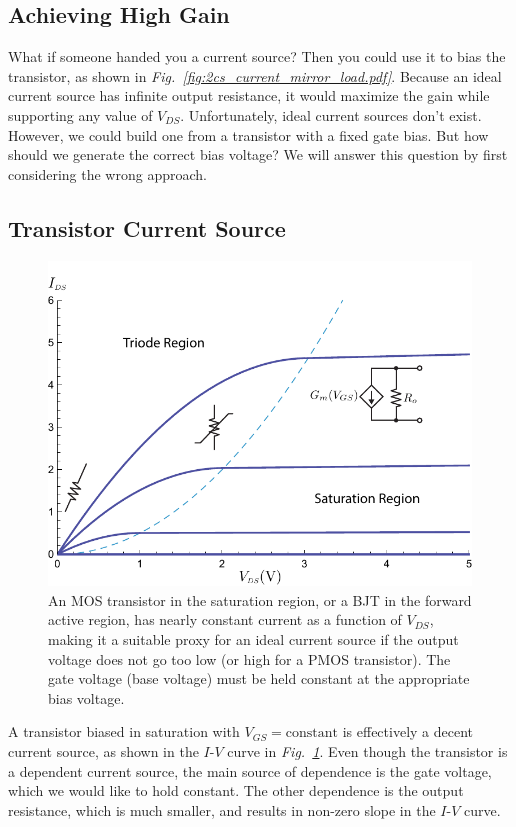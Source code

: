 \subsection{Achieving High Gain}
What if someone handed you a current source?  Then you could use it to bias the transistor, as shown in \emph{Fig.~\ref{fig:2cs_current_mirror_load.pdf}}.  Because an ideal current source has infinite output resistance, it would maximize the gain while supporting any value of $V_{DS}$.  Unfortunately, ideal current sources don't exist.  However, we could build one from a transistor with a fixed gate bias.  But how should we generate the correct bias voltage?  We will answer this question by first considering the wrong approach.
\newpage
\subsection{Transistor Current Source}
\begin{figure}[tb]
\centering
\includegraphics[width=.75\columnwidth]{mos_building_block.pdf}
\caption{An MOS transistor in the saturation region, or a BJT in the forward active region, has nearly constant current as a function of $V_{DS}$, making it a suitable proxy for an ideal current source if the output voltage does not go too low (or high for a PMOS transistor).  The gate voltage (base voltage) must be held constant at the appropriate bias voltage.}
\label{fig:mos_building_block.pdf}
\end{figure}
A transistor biased in saturation with $V_{GS} = \text{constant}$ is effectively a decent current source, as shown in the $I$-$V$ curve in \emph{Fig.~\ref{fig:mos_building_block.pdf}}.  Even though the transistor is a dependent current source, the main source of dependence is the gate voltage, which we would like to hold constant.  The other dependence is the output resistance, which is much smaller, and results in non-zero slope in the $I$-$V$ curve. 
